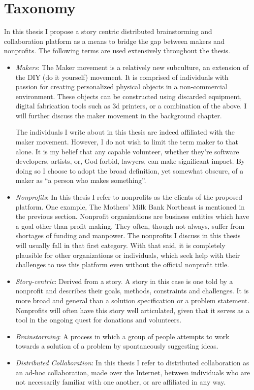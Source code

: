 \section{Taxonomy}
In this thesis I propose a story centric distributed brainstorming and collaboration platform as a means to bridge the gap between makers and nonprofits. The following terms are used extensively throughout the thesis.

\begin{itemize}
\item \textit{Makers}:
The Maker movement is a relatively new subculture, an extension of the DIY (do it yourself) movement. It is comprised of individuals with passion for creating personalized physical objects in a non-commercial environment. These objects can be constructed using discarded equipment, digital fabrication tools such as 3d printers, or a combination of the above. I will further discuss the maker movement in the background chapter.

The individuals I write about in this thesis are indeed affiliated with the maker movement. However, I do not wish to limit the term maker to that alone. It is my belief that any capable volunteer, whether they're software developers, artists, or, God forbid, lawyers, can make significant impact. By doing so I choose to adopt the broad definition, yet somewhat obscure, of a maker as ``a person who makes something''. 

\item \textit{Nonprofits}: 
In this thesis I refer to nonprofits as the clients of the proposed platform. One example, The Mothers' Milk Bank Northeast is mentioned in the previous section. Nonprofit organizations are business entities which have a goal other than profit making. They often, though not always, suffer from shortages of funding and manpower. The nonprofits I discuss in this thesis will usually fall in that first category. With that said, it is completely plausible for other organizations or individuals, which seek help with their challenges to use this platform even without the official nonprofit title.

\item \textit{Story-centric}:
Derived from a story. A story in this case is one told by a nonprofit and describes their goals, methods, constraints and challenges. It is more broad and general than a solution specification or a problem statement. Nonprofits will often have this story well articulated, given that it serves as a tool in the ongoing quest for donations and volunteers. 

\item \textit{Brainstorming}:
A process in which a group of people attempts to work towards a solution of a problem by spontaneously suggesting ideas. 

\item \textit{Distributed Collaboration}:
In this thesis I refer to distributed collaboration as an ad-hoc collaboration, made over the Internet, between individuals who are not necessarily familiar with one another, or are affiliated in any way.  

\end{itemize}

